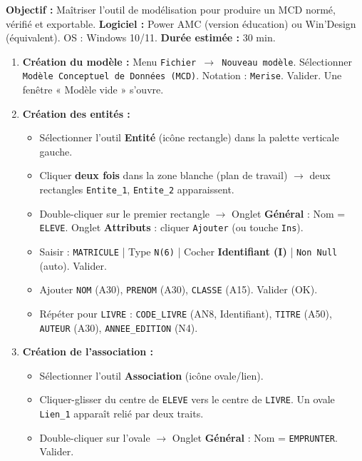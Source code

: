 \documentclass[11pt]{article}
\begin{document}
\begin{experience}
\textbf{Objectif :} Maîtriser l'outil de modélisation pour produire un MCD normé, vérifié et exportable.
\textbf{Logiciel :} Power AMC (version éducation) ou Win'Design (équivalent). OS : Windows 10/11.
\textbf{Durée estimée :} 30 min.

\begin{methode}
\begin{enumerate}
  \item \textbf{Création du modèle :} Menu \texttt{Fichier $\rightarrow$ Nouveau modèle}. Sélectionner \texttt{Modèle Conceptuel de Données (MCD)}. Notation : \texttt{Merise}. Valider. Une fenêtre « Modèle vide » s'ouvre.
  \item \textbf{Création des entités :}
  \begin{itemize}
    \item Sélectionner l'outil \textbf{Entité} (icône rectangle) dans la palette verticale gauche.
    \item Cliquer \textbf{deux fois} dans la zone blanche (plan de travail) $\rightarrow$ deux rectangles \texttt{Entite\_1}, \texttt{Entite\_2} apparaissent.
    \item Double-cliquer sur le premier rectangle $\rightarrow$ Onglet \textbf{Général} : Nom = \texttt{ELEVE}. Onglet \textbf{Attributs} : cliquer \texttt{Ajouter} (ou touche \texttt{Ins}).
    \item Saisir : \texttt{MATRICULE} | Type \texttt{N(6)} | Cocher \textbf{Identifiant (I)} | \texttt{Non Null} (auto). Valider.
    \item Ajouter \texttt{NOM} (A30), \texttt{PRENOM} (A30), \texttt{CLASSE} (A15). Valider (OK).
    \item Répéter pour \texttt{LIVRE} : \texttt{CODE\_LIVRE} (AN8, Identifiant), \texttt{TITRE} (A50), \texttt{AUTEUR} (A30), \texttt{ANNEE\_EDITION} (N4).
  \end{itemize}
  \item \textbf{Création de l'association :}
  \begin{itemize}
    \item Sélectionner l'outil \textbf{Association} (icône ovale/lien).
    \item Cliquer-glisser du centre de \texttt{ELEVE} vers le centre de \texttt{LIVRE}. Un ovale \texttt{Lien\_1} apparaît relié par deux traits.
    \item Double-cliquer sur l'ovale $\rightarrow$ Onglet \textbf{Général} : Nom = \texttt{EMPRUNTER}. Valider.

\end{itemize}
\end{enumerate}
\end{methode}
\end{experience}
\end{document}
